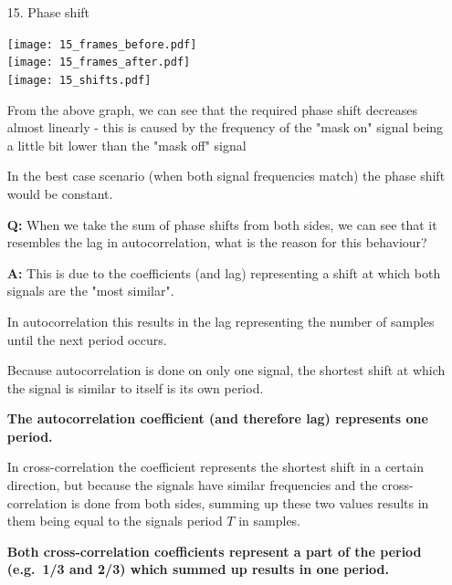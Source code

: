 \documentclass[a4paper, 11pt]{article}
\begin{document}
\begin{enumerate}
        \newpage
        \item[15.]
        Phase shift

        \texttt{[image: 15\_frames\_before.pdf]} \\
        \texttt{[image: 15\_frames\_after.pdf]} \\
        \texttt{[image: 15\_shifts.pdf]}

        From the above graph, we can see that the required phase shift decreases almost linearly -
        this is caused by the frequency of the "mask on" signal being a little bit lower than the "mask off" signal

        In the best case scenario (when both signal frequencies match) the phase shift would be constant.

        \vspace{6mm}

        \textbf{Q:} When we take the sum of phase shifts from both sides,
        we can see that it resembles the lag in autocorrelation,
        what is the reason for this behaviour?

        \textbf{A:} This is due to the coefficients (and lag) representing a shift at which both signals are the "most similar".

        In autocorrelation this results in the lag representing the number of samples until the next period occurs.

        Because autocorrelation is done on only one signal,
        the shortest shift at which the signal is similar to itself is its own period.

        \textbf{The autocorrelation coefficient (and therefore lag) represents one period.}

        In cross-correlation the coefficient represents the shortest shift in a certain direction,
        but because the signals have similar frequencies and the cross-correlation is done from both sides,
        summing up these two values results in them
        being equal to the signals period $T$ in samples.

        \textbf{Both cross-correlation coefficients represent a part of the period (e.g.\ 1/3 and 2/3)
        which summed up results in one period.}
    \end{enumerate}
\end{document}
